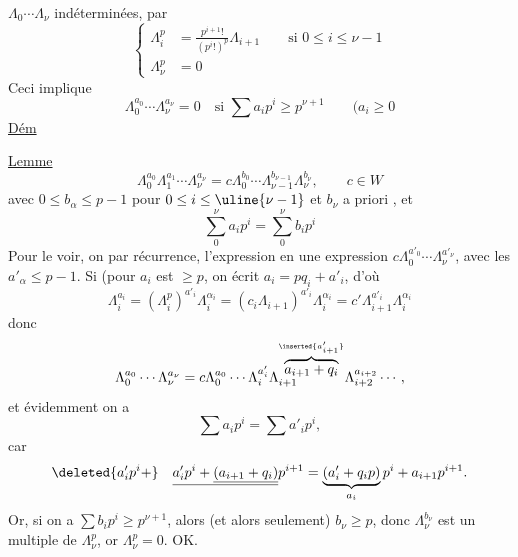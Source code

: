 $\Lambda_0\cdots\Lambda_\nu$ indéterminées,  par
\[
\left\{\begin{aligned}
\Lambda_i^p&=\frac{p^{i+1}!}{(p^i!)^p}\Lambda_{i+1}\qquad\text{si }0\leq i\leq\nu-1\\
\Lambda_\nu^p&=0
\end{aligned}\right.
\]
Ceci implique
\[
\Lambda_0^{a_0}\cdots\Lambda_\nu^{a_\nu}=0\quad\text{si }\sum a_ip^i\geq p^{\nu+1}\qquad(a_i\geq0
\]
 \uline{Dém} 

 

\uline{Lemme}
\[
\Lambda_0^{a_0}\Lambda_1^{a_1}\cdots\Lambda_\nu^{a_\nu}=c\Lambda_0^{b_0}\cdots\Lambda_{\nu-1}^{b_{\nu-1}}\Lambda_\nu^{b_\nu},\qquad c\in W
\]
avec $0\leq b_\alpha\leq p-1$ pour $0\leq i\leq\uline{\nu-1}$ et $b_\nu$ a priori , et
\[
\sum_0^\nu a_ip^i=\sum_0^\nu b_ip^i
\]
Pour le voir, on  par récurrence,   l'expression en une expression $c\Lambda_0^{a'_0}\cdots\Lambda_\nu^{a'_\nu}$, avec les $a'_\alpha\leq p-1$.
 
 
Si  (pour $a_i$  est $\geq p$, on écrit $a_i=pq_i+a'_i$, d'où
\[
\Lambda_i^{a_i}=(\Lambda_i^p)^{a'_i}\Lambda_i^{\alpha_i}=(c_i\Lambda_{i+1})^{a'_i}\Lambda_i^{\alpha_i}=c'\Lambda_{i+1}^{a'_i}\Lambda_i^{\alpha_i}
\]
donc
\[
\Lambda_0^{a_0}\cdots\Lambda_\nu^{a_\nu}=c\Lambda_0^{a_0}\cdots\Lambda_i^{a'_i}\Lambda_{i+1}^{\overbrace{a_{i+1}+q_i}^{\inserted{a'_{i+1}}}}\Lambda_{i+2}^{a_{i+2}}\cdots,
\]
et évidemment on a
\[
\sum a_ip^i=\sum a'_ip^i,
\]
car
\[
\deleted{a'_ip^i+}\quad\underline{a'_ip^i+\underline{(a_{i+1}+q_i)}}p^{i+1}=\underbrace{(a'_i+q_ip)}_{a_i}p^i+a_{i+1}p^{i+1}.
\]
Or, si on a $\sum b_ip^i\geq p^{\nu+1}$, alors  (et alors seulement)  $b_\nu\geq p$, donc $\Lambda_\nu^{b_\nu}$ est un  multiple de $\Lambda_\nu^p$, or $\Lambda_\nu^p=0$. OK.



